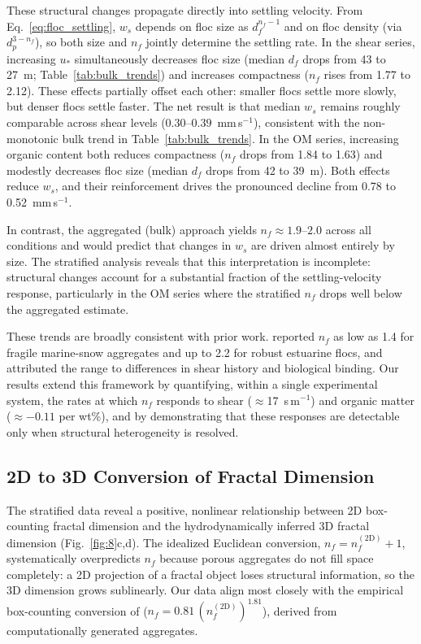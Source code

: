 \documentclass{agujournal2019}
\begin{document}
These structural changes propagate directly into settling velocity. From Eq.~\eqref{eq:floc_settling}, $w_s$ depends on floc size as $d_f^{n_f-1}$ and on floc density (via $d_p^{3-n_f}$), so both size and $n_f$ jointly determine the settling rate. In the shear series, increasing $u_*$ simultaneously decreases floc size (median $d_f$ drops from 43 to 27~\textmu m; Table~\ref{tab:bulk_trends}) and increases compactness ($n_f$ rises from 1.77 to 2.12). These effects partially offset each other: smaller flocs settle more slowly, but denser flocs settle faster. The net result is that median $w_s$ remains roughly comparable across shear levels ($0.30$--$0.39$~mm\,s$^{-1}$), consistent with the non-monotonic bulk trend in Table~\ref{tab:bulk_trends}. In the OM series, increasing organic content both reduces compactness ($n_f$ drops from 1.84 to 1.63) and modestly decreases floc size (median $d_f$ drops from 42 to 39~\textmu m). Both effects reduce $w_s$, and their reinforcement drives the pronounced decline from 0.78 to 0.52~mm\,s$^{-1}$.

In contrast, the aggregated (bulk) approach yields $n_f \approx 1.9$--$2.0$ across all conditions and would predict that changes in $w_s$ are driven almost entirely by size. The stratified analysis reveals that this interpretation is incomplete: structural changes account for a substantial fraction of the settling-velocity response, particularly in the OM series where the stratified $n_f$ drops well below the aggregated estimate.

These trends are broadly consistent with prior work.  reported $n_f$ as low as 1.4 for fragile marine-snow aggregates and up to 2.2 for robust estuarine flocs, and attributed the range to differences in shear history and biological binding. Our results extend this framework by quantifying, within a single experimental system, the rates at which $n_f$ responds to shear ($\approx$17~s\,m$^{-1}$) and organic matter ($\approx -0.11$ per wt\%), and by demonstrating that these responses are detectable only when structural heterogeneity is resolved.

\subsection{2D to 3D Conversion of Fractal Dimension}

The stratified data reveal a positive, nonlinear relationship between 2D box-counting fractal dimension and the hydrodynamically inferred 3D fractal dimension (Fig.~\ref{fig:8}c,d). The idealized Euclidean conversion, $n_f = n_f^{(2\mathrm{D})} + 1$, systematically overpredicts $n_f$ because porous aggregates do not fill space completely: a 2D projection of a fractal object loses structural information, so the 3D dimension grows sublinearly. Our data align most closely with the empirical box-counting conversion of  ($n_f = 0.81\,(n_f^{(2\mathrm{D})})^{1.81}$), derived from computationally generated aggregates.
\end{document}
